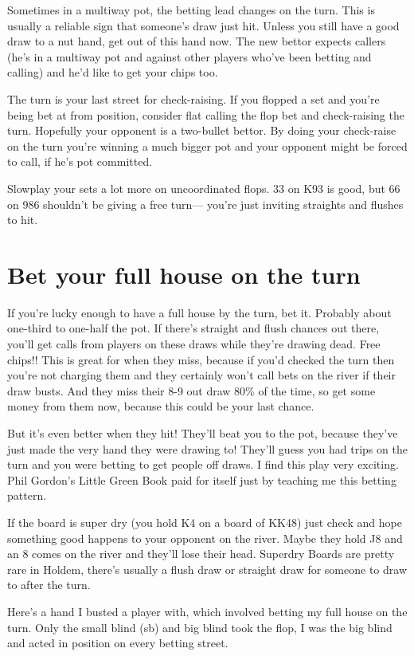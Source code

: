 Sometimes in a multiway pot, the betting lead changes on the turn.
This is usually a reliable sign that someone's draw just hit. Unless
you still have a good draw to a nut hand, get out of this hand now.
The new bettor expects callers (he's in a multiway pot and against
other players who've been betting and calling) and he'd like to
get your chips too.

The turn is your last street for check-raising. If you flopped a set
and you're being bet at from position, consider flat calling the
flop bet and check-raising the turn. Hopefully your opponent
is a two-bullet bettor. By doing your check-raise on the turn
you're winning a much bigger pot and your opponent might be
forced to call, if he's pot committed.

Slowplay your sets a lot more on uncoordinated flops. 33 on K93 is good,
but 66 on 986 shouldn't be giving a free turn--- you're just inviting
straights and flushes to hit.

\section{Bet your full house on the turn}

If you're lucky enough to have a full house by the turn, bet it.
Probably about one-third to one-half the pot. If there's straight
and flush chances out there, you'll get calls from players on
these draws while they're drawing dead. Free chips!! This is great for when
they miss, because if you'd checked the turn then you're not charging them and
they certainly won't call bets on the river if their draw busts.
And they miss their 8-9 out draw 80\% of the time, so get some money
from them now, because this could be your last chance.

But it's even better when they hit! They'll beat you to the pot, because
they've just made the very hand they were drawing to! They'll guess
you had trips on the turn and you were betting to get people off draws.
I find this play very exciting. Phil Gordon's
Little Green Book paid for itself just by teaching me this betting pattern.

If the board is super dry (you hold K4 on a board
of KK48) just check and hope something good happens
to your opponent on the river. Maybe they hold J8 and an 8 comes
on the river and they'll lose their head. Superdry Boards
are pretty rare in Holdem, there's usually a flush draw or straight draw
for someone to draw to after the turn.

Here's a hand I busted a player with, which involved betting my full
house on the turn. Only the small blind (sb) and big blind took the flop,
I was the big blind and acted in position on every betting
street.

